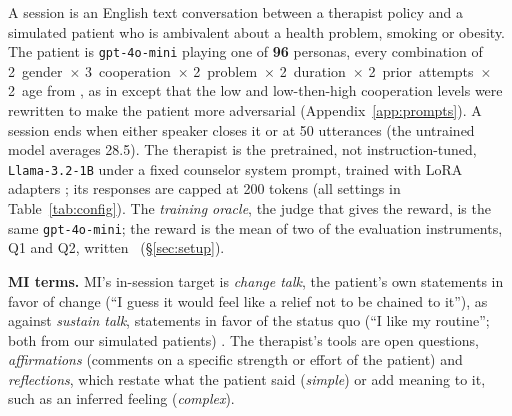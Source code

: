 A session is an English text conversation between a therapist policy and
a simulated patient who is ambivalent about a health problem, smoking or obesity.
The patient is \texttt{gpt-4o-mini} playing one of \textbf{96} personas, every combination of
2~gender~$\times$ 3~cooperation~$\times$ 2~problem~$\times$ 2~duration~$\times$
2~prior~attempts~$\times$ 2~age from \citet{yosef2024assessing}, as in \citet{baruch2025pto} except
that the low and low-then-high cooperation levels were rewritten to make the patient more adversarial
(Appendix~\ref{app:prompts}). A session ends when either speaker closes it or at 50 utterances (the
untrained model averages 28.5). The therapist is the pretrained, not instruction-tuned,
\texttt{Llama-3.2-1B} \citep{grattafiori2024llama3} under a fixed counselor system prompt, trained
with LoRA adapters \citep{hu2022lora}; its responses are capped at 200 tokens (all settings in
Table~\ref{tab:config}). The \emph{training oracle}, the judge that gives the reward, is the same
\texttt{gpt-4o-mini}; the reward is the mean of two of the evaluation instruments, Q1 and Q2,
written \QQ\ (\S\ref{sec:setup}).

\textbf{MI terms.} MI's in-session target is \emph{change talk}, the patient's own statements in favor
of change (``I guess it would feel like a relief not to be chained to it''), as against
\emph{sustain talk}, statements in favor of the status quo (``I like my routine''; both from our simulated patients)
\citep{miller2013mi, moyers2016miti}. The therapist's tools are open
questions, \emph{affirmations} (comments on a specific strength or effort of the patient) and
\emph{reflections}, which restate what the patient said (\emph{simple}) or add meaning to it, such
as an inferred feeling (\emph{complex}).

